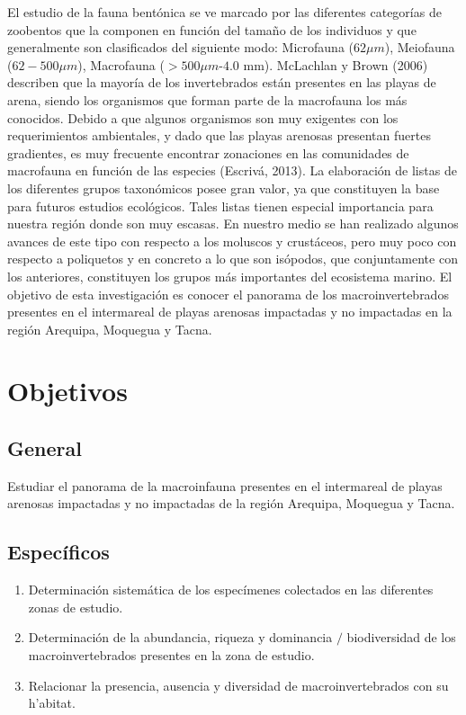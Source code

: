 \documentclass[5p,times,authoryear]{elsarticle}
\begin{document}
El estudio de la fauna bent\'onica se ve marcado por las diferentes categor\'ias de zoobentos que la componen en funci\'on del tama\~no de los individuos y que generalmente son clasificados del siguiente modo: Microfauna ($62\mu m$), Meiofauna ($62-500\mu m$), Macrofauna ($>500\mu m$-$4.0$ mm). McLachlan y Brown (2006) describen que la mayor\'ia de los invertebrados est\'an presentes en las playas de arena, siendo los organismos que forman parte de la macrofauna los m\'as conocidos. Debido a que algunos organismos son muy exigentes con los requerimientos ambientales, y dado que las playas arenosas presentan  fuertes gradientes, es muy frecuente encontrar zonaciones en las comunidades de macrofauna en funci\'on de las especies (Escriv\'a, 2013).
La elaboraci\'on de listas de los diferentes grupos taxon\'omicos posee gran valor, ya que constituyen la base para futuros estudios ecol\'ogicos. Tales listas tienen especial importancia para nuestra regi\'on donde son muy escasas. En nuestro medio se han realizado algunos avances de este tipo con respecto a los moluscos y crust\'aceos, pero muy poco con respecto a poliquetos y en concreto a lo que son is\'opodos, que conjuntamente con los anteriores, constituyen los grupos m\'as importantes del ecosistema marino.
El objetivo de esta investigaci\'on es conocer el panorama de los macroinvertebrados presentes en el intermareal de playas arenosas impactadas y no impactadas en la regi\'on Arequipa, Moquegua y Tacna. 

\section{Objetivos}

\subsection{General}

Estudiar el panorama de la macroinfauna presentes en el intermareal de playas arenosas impactadas y no impactadas de la regi\'on Arequipa, Moquegua y Tacna. 

\subsection{Espec\'ificos}
\begin{enumerate}
\item Determinaci\'on sistem\'atica de los espec\'imenes colectados en las diferentes zonas de estudio.
\item Determinaci\'on de la abundancia, riqueza y dominancia $/$ biodiversidad de los macroinvertebrados presentes en la zona de estudio.
\item Relacionar la presencia, ausencia y diversidad de macroinvertebrados  con su h'abitat.
\end{enumerate}
\end{document}
